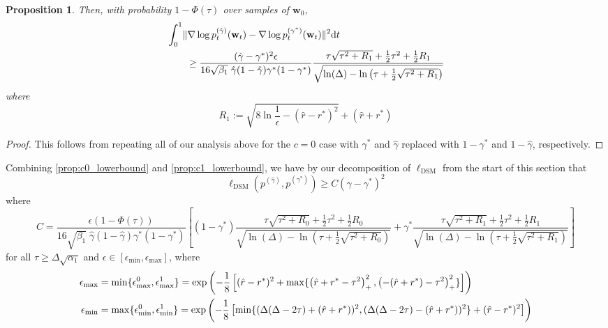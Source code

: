 \documentclass[11pt]{article}
\newcommand{\fitparenth}[1]{\left(#1\right)}
\newcommand{\fitbracket}[1]{\left[#1\right]}
\newcommand{\vect}[1]{\mathbf{#1}}
\theoremstyle{plain}
\newtheorem{proposition}[theorem]{Proposition}
\newcommand{\1}{\mathbbm{1}}
\DeclarePairedDelimiter{\norm}{\lVert}{\rVert}
\DeclarePairedDelimiter{\set}{\lbrace}{\rbrace}
\newcommand{\ldsm}{\ell_\mathrm{DSM}}
\newcommand{\pdist}[2][]{p_{#1}^{(#2)}}
\newcommand{\separation}{\Delta}
\begin{document}
\begin{appendices}
\begin{proposition}
    Then, with probability $1-\Phi(\tau)$ over samples of $\vect w_0$, 
    \begin{align*}
        &\int_0^1\norm{\nabla \log \pdist[t]{\hat \gamma}(\vect w_t) - \nabla \log \pdist[t]{\gamma^{*}}(\vect w_t)}^2 \mathrm{d}t
        \\
        &\quad\quad\geq\frac{(\hat \gamma-\gamma^*)^2 \epsilon}{16\sqrt{\beta_1}\; \hat \gamma (1-\hat \gamma) \gamma^* (1-\gamma^*)} 
        \frac{\tau\sqrt{\tau^2 + R_1}+\frac{1}{2}\tau^2 + \frac{1}{2}R_1}{\sqrt{\ln(\separation)- \ln\fitparenth{\tau+ \frac{1}{2}\sqrt{\tau^2 + R_1}}}}
    \end{align*}
    where
    \[R_1:=\sqrt{8\ln \frac{1}{\epsilon}-(\hat r-r^*)^2}+(\hat r+r^*)\]
\end{proposition}

\begin{proof}
    This follows from repeating all of our analysis above for the $c=0$ case with $\gamma^*$ and $\hat \gamma$ replaced with $1-\gamma^*$ and $1-\hat \gamma$, respectively. 
\end{proof}

Combining \cref{prop:c0_lowerbound} and \cref{prop:c1_lowerbound}, we have by our decomposition of $\ldsm$ from the start of this section that 
\[\ldsm (\pdist{\hat \gamma},\pdist{\gamma^*})\geq C (\hat\gamma - \gamma^*)^2\]
where
\[C=\frac{ \epsilon ( 1-\Phi(\tau))}{16\sqrt{\beta_1}\; \hat\gamma (1-\hat\gamma) \gamma^* (1-\gamma^*)}\left[(1-\gamma^*)\frac{\tau\sqrt{\tau^2 + R_0}+\frac{1}{2}\tau^2 + \frac{1}{2}R_0}{\sqrt{\ln(\separation)- \ln\fitparenth{\tau+ \frac{1}{2}\sqrt{\tau^2 + R_0}}}}+\gamma^* \frac{\tau\sqrt{\tau^2 + R_1}+\frac{1}{2}\tau^2 + \frac{1}{2}R_1}{\sqrt{\ln(\separation)- \ln\fitparenth{\tau+ \frac{1}{2}\sqrt{\tau^2 + R_1}}}}\right]\]
for all $\tau\geq \separation\sqrt{\alpha_1}$ and $\epsilon\in [ \epsilon_{\mathrm{min}}, \epsilon_{\mathrm{\max}}]$, where
\begin{align*}
\epsilon_{\mathrm{max}}&=\min\set{\epsilon_{\mathrm{max}}^0,\epsilon_{\mathrm{max}}^1}=\exp\fitparenth{-\frac{1}{8}\fitbracket{(\hat r-r^*)^2 + \max\set{\fitparenth{\hat r+r^*-\tau^2}_+^2,\fitparenth{-(\hat r+r^*)-\tau^2}_+^2}}}
\\
\epsilon_{\mathrm{min}}&=\max\set{\epsilon_{\mathrm{min}}^0,\epsilon_{\mathrm{min}}^1}=\exp\fitparenth{-\frac{1}{8}\fitbracket{\min\set{(\separation(\separation - 2\tau)+(\hat r+r^*))^2,(\separation(\separation - 2\tau)-(\hat r+r^*))^2} + (\hat r-r^*)^2}}
\end{align*}


\end{appendices}
\end{document}
